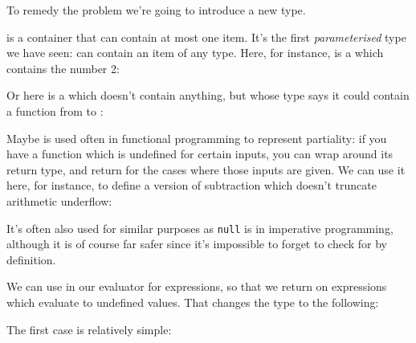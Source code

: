To remedy the problem we're going to introduce a new type.
\begin{agdalisting}
\end{agdalisting}
 is a container that can contain at most one item.
It's the first \emph{parameterised} type we have seen:  can
contain an item of any type.
Here, for instance, is a  which contains the number 2:
\begin{agdalisting*}
\end{agdalisting*}
Or here is a  which doesn't contain anything, but whose type
says it could contain a function from \Nat to \Nat:
\begin{agdalisting*}
\end{agdalisting*}

Maybe is used often in functional programming to represent partiality: if you
have a function which is undefined for certain inputs, you can wrap
 around its return type, and return
 for the cases where those inputs are given.
We can use it here, for instance, to define a version of subtraction which
doesn't truncate arithmetic underflow:
\begin{agdalisting}
\end{agdalisting}
It's often also used for similar purposes as \verb+null+ is in imperative
programming, although it is of course far safer since it's impossible to forget
to check for  by definition.

We can use  in our evaluator for expressions, so that we
return  on expressions which evaluate to
undefined values.
That changes the type to the following:
\begin{agdalisting*}
\end{agdalisting*}
The first case is relatively simple:
\begin{agdalisting*}
\end{agdalisting*}


